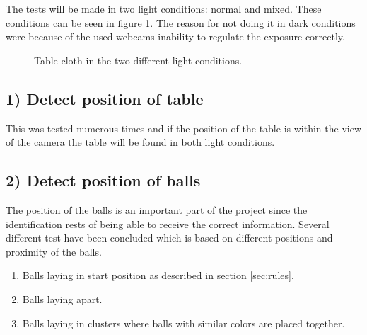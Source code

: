 
The tests will be made in two light conditions: normal and mixed. These conditions can be seen in figure \ref{fig:difflightcon}. The reason for not doing it in dark conditions were because of the used webcams inability to regulate the exposure correctly.\\

\begin{figure}[H]
  \centering
  \quad           
   \caption{Table cloth in the two different light conditions.}
  \label{fig:difflightcon}
\end{figure}


\subsection{1) Detect position of table}

This was tested numerous times and if the position of the table is within the view of the camera the table will be found in both light conditions.\\

\subsection{2) Detect position of balls}

The position of the balls is an important part of the project since the identification rests of being able to receive the correct information. Several different test have been concluded which is based on different positions and proximity of the balls.

\begin{enumerate}
\setlength{\itemsep}{0mm}
	\item Balls laying in start position as described in section \ref{sec:rules}.\\
	\item Balls laying apart.\\
	\item Balls laying in clusters where balls with similar colors are placed together.\\
\end{enumerate}

